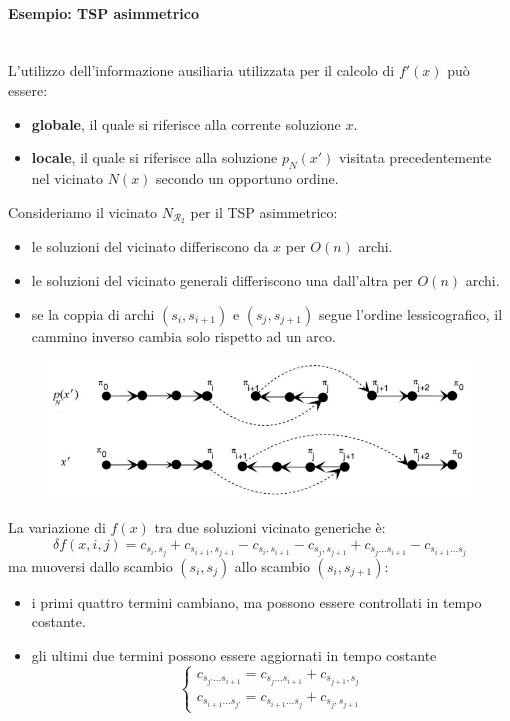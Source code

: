 \documentclass{article}
\begin{document}
\paragraph{Esempio: TSP asimmetrico}\mbox{}\\
L'utilizzo dell'informazione ausiliaria utilizzata per il calcolo di $f'(x)$ può essere:
\begin{itemize}
    \item \textbf{globale}, il quale si riferisce alla corrente soluzione $x$.
    \item \textbf{locale}, il quale si riferisce alla soluzione $p_N(x')$ visitata precedentemente
    nel vicinato $N(x)$ secondo un opportuno ordine.
\end{itemize}
Consideriamo il vicinato $N_{\mathcal{R}_2}$ per il TSP asimmetrico:
\begin{itemize}
    \item le soluzioni del vicinato differiscono da $x$ per $O(n)$ archi.
    \item le soluzioni del vicinato generali differiscono una dall'altra per $O(n)$ archi.
    \item se la coppia di archi $(s_i,s_{i+1})$ e $(s_j,s_{j+1})$ segue l'ordine lessicografico,
    il cammino inverso cambia solo rispetto ad un arco.
\end{itemize}
\begin{figure}[H]
    \centering
    \includegraphics[scale=0.5]{images/lez14_3.png}
\end{figure}
La variazione di $f(x)$ tra due soluzioni vicinato generiche è:
$$\delta f(x,i,j)=c_{s_i,s_j}+c_{s_{i+1},s_{j+1}}-c_{s_i,s_{i+1}}-c_{s_j,s_{j+1}}+c_{s_j\dots s_{i+1}}-c_{s_{i+1}\dots s_j}$$
ma muoversi dallo scambio $(s_i,s_j)$ allo scambio $(s_i,s_{j+1})$:
\begin{itemize}
    \item i primi quattro termini cambiano, ma possono essere controllati in tempo costante.
    \item gli ultimi due termini possono essere aggiornati in tempo costante
    \[
        \begin{cases}
            c_{s_{j'}\dots s_{i+1}} = c_{s_j\dots s_{i+1}}+c_{s_{j+1},s_j}\\
            c_{s_{i+1}\dots s_{j'}} = c_{s_{i+1}\dots s_j}+c_{s_j,s_{j+1}}
        \end{cases}
    \]
\end{itemize}
\end{document}
